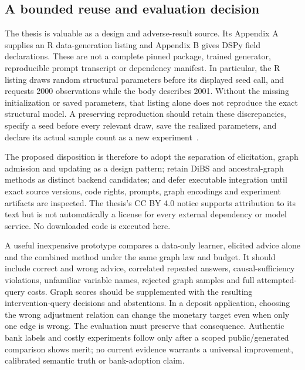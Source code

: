 \subsection{A bounded reuse and evaluation decision}
The thesis is valuable as a design and adverse-result source. Its Appendix A supplies an R data-generation listing and Appendix B gives DSPy field declarations. These are not a complete pinned package, trained generator, reproducible prompt transcript or dependency manifest. In particular, the R listing draws random structural parameters before its displayed seed call, and requests 2000 observations while the body describes 2001. Without the missing initialization or saved parameters, that listing alone does not reproduce the exact structural model. A preserving reproduction should retain these discrepancies, specify a seed before every relevant draw, save the realized parameters, and declare its actual sample count as a new experiment~\citep{exec18_videira_thesis}.

The proposed disposition is therefore to adopt the separation of elicitation, graph admission and updating as a design pattern; retain DiBS and ancestral-graph methods as distinct backend candidates; and defer executable integration until exact source versions, code rights, prompts, graph encodings and experiment artifacts are inspected. The thesis's CC BY 4.0 notice supports attribution to its text but is not automatically a license for every external dependency or model service. No downloaded code is executed here.

A useful inexpensive prototype compares a data-only learner, elicited advice alone and the combined method under the same graph law and budget. It should include correct and wrong advice, correlated repeated answers, causal-sufficiency violations, unfamiliar variable names, rejected graph samples and full attempted-query costs. Graph scores should be supplemented with the resulting intervention-query decisions and abstentions. In a deposit application, choosing the wrong adjustment relation can change the monetary target even when only one edge is wrong. The evaluation must preserve that consequence. Authentic bank labels and costly experiments follow only after a scoped public/generated comparison shows merit; no current evidence warrants a universal improvement, calibrated semantic truth or bank-adoption claim.
\label{exec18:bayesian-advice-end}
